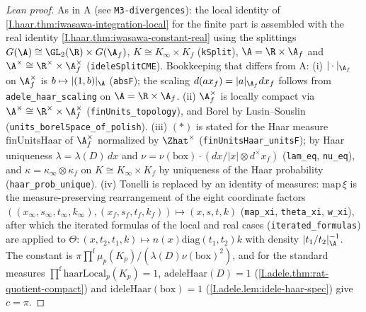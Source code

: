 \begin{proof}[Lean proof]
As in A (see \texttt{M3-divergences}): the local identity of \cref{I.haar.thm:iwasawa-integration-local} for the finite part is assembled with the real identity \cref{I.haar.thm:iwasawa-constant-real} using the splittings $G(\A)\cong\GL_2(\R)\times G(\A_f)$, $K\cong K_\infty\times K_f$ (\texttt{kSplit}), $\A=\R\times\A_f$ and $\A^\times\cong\R^\times\times\A_f^\times$ (\texttt{ideleSplitCME}). Bookkeeping that differs from A: (i) $|\cdot|_{\A_f}$ on $\A_f^\times$ is $b\mapsto|(1,b)|_\A$ (\texttt{absF}); the scaling $d(ax_f)=|a|_{\A_f}dx_f$ follows from \texttt{adele\_haar\_scaling} on $\A=\R\times\A_f$. (ii) $\A_f^\times$ is locally compact via $\A^\times\cong\R^\times\times\A_f^\times$ (\texttt{finUnits\_topology}), and Borel by Lusin--Souslin (\texttt{units\_borelSpace\_of\_polish}). (iii) $(\ast)$ is stated for the Haar measure $\mathrm{finUnitsHaar}$ of $\A_f^\times$ normalized by $\Zhat^\times$ (\texttt{finUnitsHaar\_unitsF}); by Haar uniqueness $\lambda=\lambda(D)\,dx$ and $\nu=\nu(\text{box})\cdot(dx/|x|\otimes d^\times x_f)$ (\texttt{lam\_eq}, \texttt{nu\_eq}), and $\kappa=\kappa_\infty\otimes\kappa_f$ on $K\cong K_\infty\times K_f$ by uniqueness of the Haar probability (\texttt{haar\_prob\_unique}). (iv) Tonelli is replaced by an identity of measures: $\mathrm{map}\,\xi$ is the measure-preserving rearrangement of the eight coordinate factors $((x_\infty,s_\infty,t_\infty,k_\infty),(x_f,s_f,t_f,k_f))\mapsto(x,s,t,k)$ (\texttt{map\_xi}, \texttt{theta\_xi}, \texttt{w\_xi}), after which the iterated formulas of the local and real cases (\texttt{iterated\_formulas}) are applied to $\Theta\colon(x,t_2,t_1,k)\mapsto n(x)\mathrm{diag}(t_1,t_2)k$ with density $|t_1/t_2|_\A^{-1}$. The constant is $\pi\prod^{\mathrm f}\mu_p(K_p)/(\lambda(D)\nu(\text{box})^2)$, and for the standard measures $\prod^{\mathrm f}\mathrm{haarLocal}_p(K_p)=1$, $\mathrm{adeleHaar}(D)=1$ (\cref{I.adele.thm:rat-quotient-compact}) and $\mathrm{ideleHaar}(\text{box})=1$ (\cref{I.adele.lem:idele-haar-spec}) give $c=\pi$.
\end{proof}


